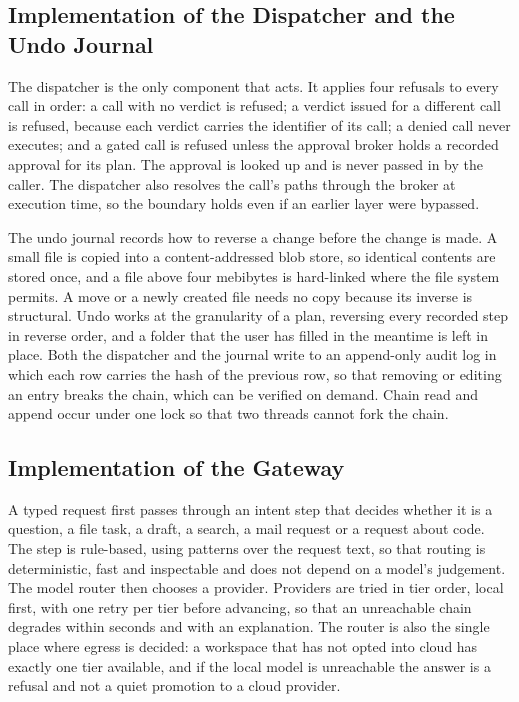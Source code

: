 \documentclass{FastFyp}
\begin{document}
\subsection{Implementation of the Dispatcher and the Undo Journal}
The dispatcher is the only component that acts. It applies four refusals to every call in order: a call with no verdict is refused; a verdict issued for a different call is refused, because each verdict carries the identifier of its call; a denied call never executes; and a gated call is refused unless the approval broker holds a recorded approval for its plan. The approval is looked up and is never passed in by the caller. The dispatcher also resolves the call's paths through the broker at execution time, so the boundary holds even if an earlier layer were bypassed.

The undo journal records how to reverse a change before the change is made. A small file is copied into a content-addressed blob store, so identical contents are stored once, and a file above four mebibytes is hard-linked where the file system permits. A move or a newly created file needs no copy because its inverse is structural. Undo works at the granularity of a plan, reversing every recorded step in reverse order, and a folder that the user has filled in the meantime is left in place. Both the dispatcher and the journal write to an append-only audit log in which each row carries the hash of the previous row, so that removing or editing an entry breaks the chain, which can be verified on demand. Chain read and append occur under one lock so that two threads cannot fork the chain.

\subsection{Implementation of the Gateway}
A typed request first passes through an intent step that decides whether it is a question, a file task, a draft, a search, a mail request or a request about code. The step is rule-based, using patterns over the request text, so that routing is deterministic, fast and inspectable and does not depend on a model's judgement. The model router then chooses a provider. Providers are tried in tier order, local first, with one retry per tier before advancing, so that an unreachable chain degrades within seconds and with an explanation. The router is also the single place where egress is decided: a workspace that has not opted into cloud has exactly one tier available, and if the local model is unreachable the answer is a refusal and not a quiet promotion to a cloud provider.
\end{document}
